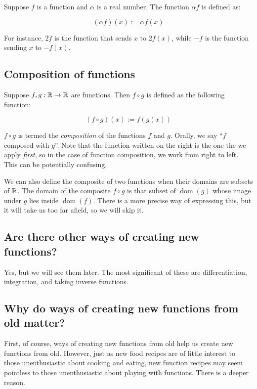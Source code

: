 \documentclass{amsart}
\begin{document}
Suppose $f$ is a function and $\alpha$ is a real number. The function
$\alpha f$ is defined as:

\begin{equation*}
  (\alpha f)(x) := \alpha f(x)
\end{equation*}

For instance, $2f$ is the function that sends $x$ to $2f(x)$, while
$-f$ is the function sending $x$ to $-f(x)$.

\subsection{Composition of functions}

Suppose $f,g:\mathbb{R} \to \mathbb{R}$ are functions. Then $f \circ g$ is defined as
the following function:

\begin{equation*}
  (f \circ g)(x) := f(g(x))
\end{equation*}

$f \circ g$ is termed the {\em composition} of the functions $f$ and
$g$. Orally, we say ``$f$ composed with $g$''. Note that the function
written on the right is the one the we apply {\em first}, so in the
case of function composition, we work from right to left. This can be
potentially confusing.

We can also define the composite of two functions when their domains
are subsets of $\mathbb{R}$. The domain of the composite $f \circ g$ is that
subset of $\operatorname{dom}(g)$ whose image under $g$ lies inside
$\operatorname{dom}(f)$. There is a more precise way of expressing
this, but it will take us too far afield, so we will skip it.

\subsection{Are there other ways of creating new functions?}

Yes, but we will see them later. The most significant of these are
differentiation, integration, and taking inverse functions.

\subsection{Why do ways of creating new functions from old matter?}

First, of course, ways of creating new functions from old help us
create new functions from old. However, just as new food recipes are
of little interest to those unenthusiastic about cooking and eating,
new function recipes may seem pointless to those unenthusiastic about
playing with functions. There is a deeper reason.
\end{document}
